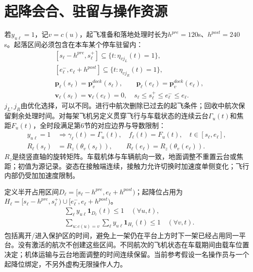 \section{起降会合、驻留与操作资源}
\noindent 若$y_{u\ell}=1$，记$v=c(u)$，起飞准备和落地处理时长为$h^{pre}=120$s、$h^{post}=240$s。起落区间必须包含在本车某个停车驻留内：
\begin{align}
 &[s_\ell-h^{pre},s_\ell^+]\subseteq\{t:\eta_{vj_L}(t)=1\},\\
 &[e_\ell^-,e_\ell+h^{post}]\subseteq\{t:\eta_{vj_R}(t)=1\},\\
 &\mathbf p_\ell(s_\ell)=\mathbf p_v^{dock}(s_\ell),\qquad
 \mathbf p_\ell(e_\ell)=\mathbf p_v^{dock}(e_\ell),\\
 &\mathbf v_\ell(s_\ell)=\mathbf v_\ell(e_\ell)=0,\quad
 s_\ell\le s_\ell^+\le e_\ell^-\le e_\ell.
 \label{eng:eq:rendezvous}
\end{align}
\noindent $j_L,j_R$由优化选择，可以不同。进行中航次删除已过去的起飞条件；回收中航次保留剩余处理时间。对每架飞机另定义贯穿飞行与车载状态的连续云台$\Gamma_u(t)$和焦距$F_u(t)$，全时段满足第6节的对应边界与导数限制：
\begin{align}
 y_{u\ell}=1&\Rightarrow \gamma_\ell(t)=\Gamma_u(t),\quad f_\ell(t)=F_u(t),\quad t\in[s_\ell,e_\ell],\\
 R_\ell(s_\ell)&=R_z(\theta_v(s_\ell)),\qquad R_\ell(e_\ell)=R_z(\theta_v(e_\ell)).
 \label{eng:eq:aircraftcontinuity}
\end{align}
\noindent $R_z$是绕竖直轴的旋转矩阵。车载机体与车辆航向一致，地面调整不重置云台或焦距；初值为源记录。姿态在接触端连续，接触力允许切换时加速度单侧变化；飞行内部仍受加加速度限制。

\noindent 定义半开占用区间$D_\ell=[s_\ell-h^{pre},e_\ell+h^{post})$；起降位占用为$H_\ell=[s_\ell-h^{pre},s_\ell^+)\cup[e_\ell^-,e_\ell+h^{post})$。
\begin{align}
 &\sum_{\ell}y_{u\ell}\mathbf1_{D_\ell}(t)\le1\quad(\forall u,t),\\
 &\sum_{u:c(u)=v}\sum_{\ell}y_{u\ell}\mathbf1_{H_\ell}(t)\le1
                         \quad(\forall v,t).
 \label{eng:eq:pad}
\end{align}
\noindent 包括离开/进入保护区的时间，避免上一架仍在平台上方时下一架已经占用同一平台。没有激活的航次不创建这些区间。不同航次的飞机状态在车载期间由载车位置决定；机体运输与云台地面调整的时间连续保留。当前参考假设一名操作员与一个起降位绑定，不另外虚构无限操作人力。
\clearpage

